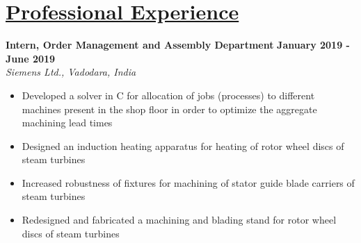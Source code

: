 \documentclass{article}
\def\siemensdate{\large{\textbf{January 2019 - June 2019}}}
\begin{document}
\section{\underline{Professional Experience}}
\large{\textbf{Intern, Order Management and Assembly Department}}
\hspace{1.2 in}
\siemensdate\\
\large{\textit{Siemens Ltd., Vadodara, India}}
\begin{itemize}
\item\large{Developed a solver in C for allocation of jobs (processes) to different machines present in the shop floor in order to optimize the aggregate machining lead times}
\item\large{Designed an induction heating apparatus for heating of rotor wheel discs of steam turbines}
\item\large{Increased robustness of fixtures for machining of stator guide blade carriers of steam turbines}
\item\large{Redesigned and fabricated a machining and blading stand for rotor wheel discs of steam turbines }
\end{itemize}
\end{document}
